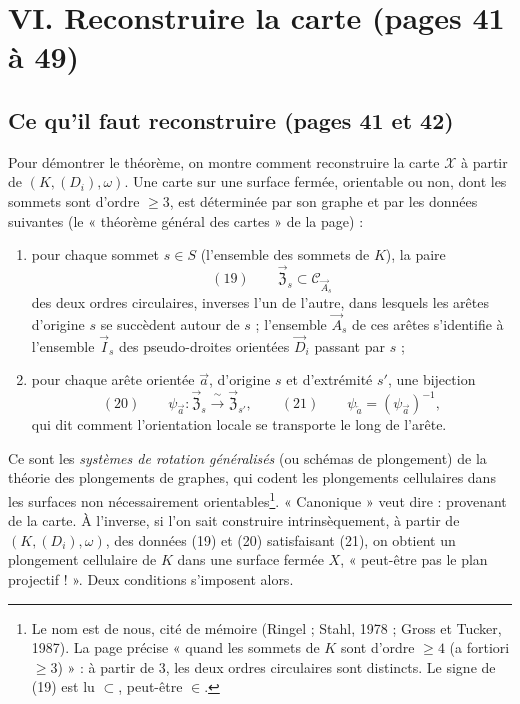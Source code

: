 \documentclass[11pt,a4paper]{article}
\begin{document}
\section*{VI. Reconstruire la carte (pages 41 à 49)}

\subsection*{Ce qu'il faut reconstruire (pages 41 et 42)}

Pour démontrer le théorème, on montre comment reconstruire la carte
$\mathcal{X}$ à partir de $(K, (D_i), \omega)$. Une carte sur une surface
fermée, orientable ou non, dont les sommets sont d'ordre $\geqslant 3$, est
déterminée par son graphe et par les données suivantes (le « théorème
général des cartes » de la page) :
\begin{enumerate}
  \item[1\textsuperscript{o})] pour chaque sommet $s \in S$ (l'ensemble des sommets
  de $K$), la paire
  \[
  (19) \qquad \vec{\mathfrak{Z}}_s \subset \mathcal{C}_{\vec{A}_s}
  \]
  des deux ordres circulaires, inverses l'un de l'autre, dans lesquels les
  arêtes d'origine $s$ se succèdent autour de $s$ ; l'ensemble $\vec{A}_s$
  de ces arêtes s'identifie à l'ensemble $\vec{I}_s$ des pseudo-droites
  orientées $\vec{D}_i$ passant par $s$ ;
  \item[2\textsuperscript{o})] pour chaque arête orientée $\vec{a}$, d'origine $s$ et
  d'extrémité $s'$, une bijection
  \[
  (20) \qquad \psi_{\vec{a}} : \vec{\mathfrak{Z}}_s \xrightarrow{\ \sim\ }
  \vec{\mathfrak{Z}}_{s'}, \qquad (21) \qquad \psi_{\overleftarrow{a}} =
  (\psi_{\vec{a}})^{-1},
  \]
  qui dit comment l'orientation locale se transporte le long de l'arête.
\end{enumerate}
Ce sont les \emph{systèmes de rotation généralisés} (ou schémas de
plongement) de la théorie des plongements de graphes, qui codent les
plongements cellulaires dans les surfaces non nécessairement
orientables\footnote{Le nom est de nous, cité de mémoire (Ringel ; Stahl,
1978 ; Gross et Tucker, 1987). La page précise « quand les sommets de $K$
sont d'ordre $\geqslant 4$ (a fortiori $\geqslant 3$) » : à partir de $3$, les
deux ordres circulaires sont distincts. Le signe de (19) est lu $\subset$,
peut-être $\in$.}. « Canonique » veut dire : provenant de la carte. À
l'inverse, si l'on sait construire intrinsèquement, à partir de $(K, (D_i),
\omega)$, des données (19) et (20) satisfaisant (21), on obtient un
plongement cellulaire de $K$ dans une surface fermée $X$, « peut-être pas
le plan projectif ! ». Deux conditions s'imposent alors.
\end{document}
